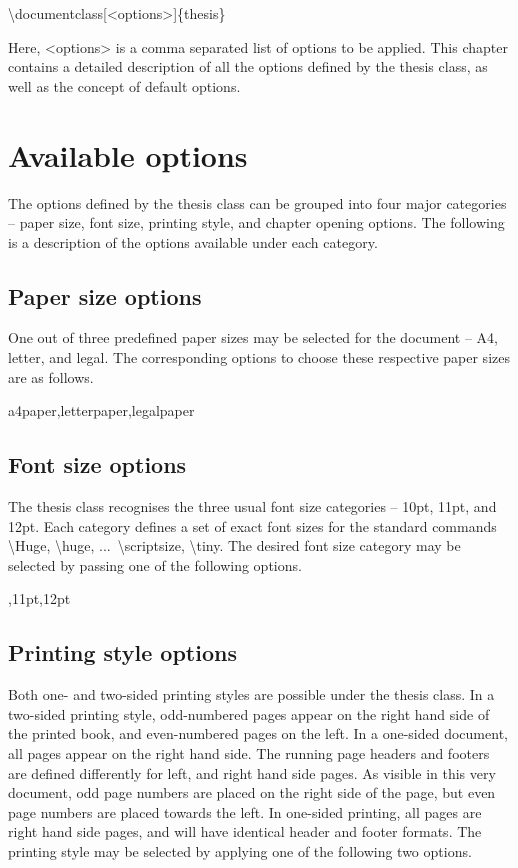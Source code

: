 \documentclass[twoside,openany]{thesis}
\begin{document}
{\ttfamily\textbackslash documentclass[<options>]\{thesis\}}

Here, {\ttfamily<options>} is a comma separated list of options to be applied.
This chapter contains a detailed description of all the options defined by the {\ttfamily thesis} class, as well as the concept of default options.

\section{Available options}\label{sec:Available options}

The options defined by the {\ttfamily thesis} class can be grouped into four major categories -- paper size, font size, printing style, and chapter opening options.
The following is a description of the options available under each category.

\subsection{Paper size options}\label{subsec:Paper size options}

One out of three predefined paper sizes may be selected for the document -- A4, letter, and legal.
The corresponding options to choose these respective paper sizes are as follows.

{\ttfamily a4paper,letterpaper,legalpaper}

\subsection{Font size options}\label{subsec:Font size options}

The {\ttfamily thesis} class recognises the three usual font size categories -- 10pt, 11pt, and 12pt.
Each category defines a set of exact font sizes for the standard commands {\ttfamily\textbackslash Huge}, {\ttfamily\textbackslash huge}, ...\ {\ttfamily\textbackslash scriptsize}, {\ttfamily\textbackslash tiny}.
The desired font size category may be selected by passing one of the following options.

{\ttfamily 10pt,11pt,12pt}

\subsection{Printing style options}\label{subsec:Printing style options}

Both one- and two-sided printing styles are possible under the {\ttfamily thesis} class.
In a two-sided printing style, odd-numbered pages appear on the right hand side of the printed book, and even-numbered pages on the left.
In a one-sided document, all pages appear on the right hand side.
The running page headers and footers are defined differently for left, and right hand side pages.
As visible in this very document, odd page numbers are placed on the right side of the page, but even page numbers are placed towards the left.
In one-sided printing, all pages are right hand side pages, and will have identical header and footer formats.
The printing style may be selected by applying one of the following two options.
\end{document}
